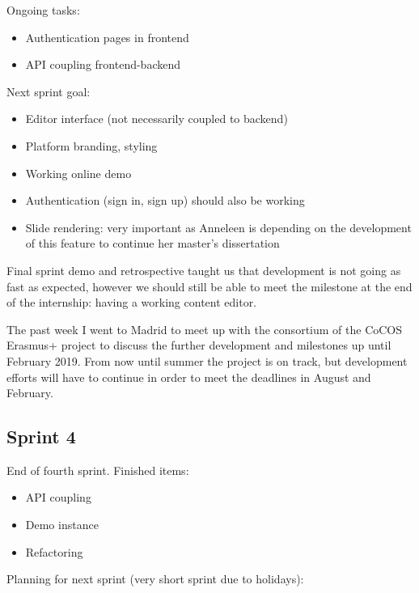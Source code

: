 \documentclass[10pt,a4paper]{article}
\begin{document}
\begin{appendices}
{        Ongoing tasks:

        \begin{itemize}
          \item Authentication pages in frontend
          \item API coupling frontend-backend
        \end{itemize}

        Next sprint goal:

        \begin{itemize}
          \item Editor interface (not necessarily coupled to backend)
          \item Platform branding, styling
          \item Working online demo
          \item Authentication (sign in, sign up) should also be working
          \item Slide rendering: very important as Anneleen is depending on the development of this feature to continue her master's dissertation
        \end{itemize}

        Final sprint demo and retrospective taught us that development is not going as fast as expected, however we should still be able to meet the milestone at the end of the internship: having a working content editor.

        The past week I went to Madrid to meet up with the consortium of the CoCOS Erasmus+ project to discuss the further development and milestones up until February 2019.
        From now until summer the project is on track, but development efforts will have to continue in order to meet the deadlines in August and February.

      \subsection*{Sprint 4}
        End of fourth sprint. Finished items:

        \begin{itemize}
          \item API coupling
          \item Demo instance
          \item Refactoring
        \end{itemize}

        Planning for next sprint (very short sprint due to holidays):

}
\end{appendices}
\end{document}
